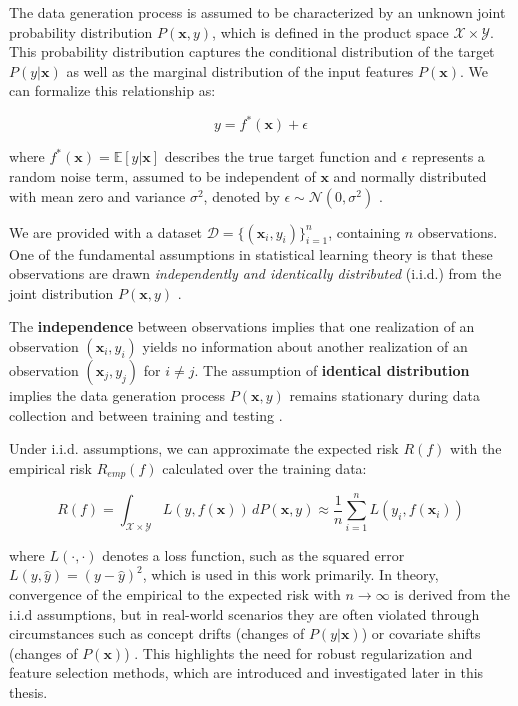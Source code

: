 \documentclass[fontsize=12 pt]{scrartcl}
\begin{document}
The data generation process is assumed to be characterized by an unknown joint probability distribution $P(\mathbf{x}, y)$, which is defined in the product space $\mathcal{X} \times \mathcal{Y}$. This probability distribution captures the conditional distribution of the target $P(y|\mathbf{x})$ as well as the marginal distribution of the input features $P(\mathbf{x})$\citep{bishop2006pattern}. We can formalize this relationship as:

\begin{equation}
    y = f^*(\mathbf{x}) + \epsilon
\end{equation}

where $f^*(\mathbf{x}) = \mathbb{E}[y|\mathbf{x}]$ describes the true target function and $\epsilon$ represents a random noise term, assumed to be independent of $\mathbf{x}$ and normally distributed with mean zero and variance $\sigma^2$, denoted by $\epsilon \sim \mathcal{N}(0, \sigma^2)$ \citep{hastie2009elements}.

We are provided with a dataset $\mathcal{D} = \{(\mathbf{x}_i, y_i)\}_{i=1}^n$, containing $n$ observations. One of the fundamental assumptions in statistical learning theory is that these observations are drawn \textit{independently and identically distributed} (i.i.d.) from the joint distribution $P(\mathbf{x}, y)$ \citep{vapnik1998statistical}.

The \textbf{independence} between observations implies that one realization of an observation $(\mathbf{x}_i, y_i)$ yields no information about another realization of an observation $(\mathbf{x}_j, y_j)$ for $i \neq j$. The assumption of \textbf{identical distribution} implies the data generation process $P(\mathbf{x}, y)$ remains stationary during data collection and between training and testing \citep{mohri2018foundations}. 

Under i.i.d. assumptions, we can approximate the expected risk $R(f)$ with the empirical risk $R_{emp}(f)$ calculated over the training data:

\begin{equation}
    R(f) = \int_{\mathcal{X} \times \mathcal{Y}} L(y, f(\mathbf{x})) \, dP(\mathbf{x}, y) \approx \frac{1}{n} \sum_{i=1}^n L(y_i, f(\mathbf{x}_i))
\end{equation}

where $L(\cdot, \cdot)$ denotes a loss function, such as the squared error $L(y, \hat{y}) = (y - \hat{y})^2$, which is used in this work primarily. In theory, convergence of the empirical to the expected risk with $n \to \infty$ is derived from the i.i.d assumptions, but in real-world scenarios they are often violated through circumstances such as concept drifts (changes of $P(y|\mathbf{x})$) or covariate shifts (changes of $P(\mathbf{x})$) \citep{quionero2009dataset}. This highlights the need for robust regularization and feature selection methods, which are introduced and investigated later in this thesis. 
\end{document}
